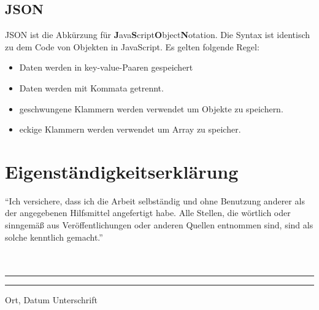 \documentclass[12pt, a4paper, twoside]{article}
\begin{document}
\subsection{JSON}
	JSON ist die Abkürzung für \textbf{J}ava\textbf{S}cript\textbf{O}bject\textbf{N}otation. Die Syntax ist identisch zu dem Code von Objekten in JavaScript. Es gelten folgende Regel:
	\begin{itemize}
		\item Daten werden in key-value-Paaren gespeichert
		\item Daten werden mit Kommata getrennt.
		\item geschwungene Klammern werden verwendet um Objekte zu speichern.
		\item eckige Klammern werden verwendet um Array zu speicher.
	\end{itemize}

\cite{w3json}

\newpage

\section{Eigenständigkeitserklärung}
``Ich versichere, dass ich die Arbeit selbständig und ohne Benutzung anderer als der angegebenen Hilfsmittel angefertigt habe. Alle Stellen, die wörtlich oder sinngemäß aus Veröffentlichungen oder anderen Quellen entnommen sind, sind als solche kenntlich gemacht.'' 
\paragraph{}$~~$\\
\paragraph{}$~~$\\
\vspace{50pt} 
\noindent\rule{5cm}{.4pt}\hfill\rule{5cm}{.4pt}\par 
\noindent Ort, Datum \hfill Unterschrift 
\end{document}
